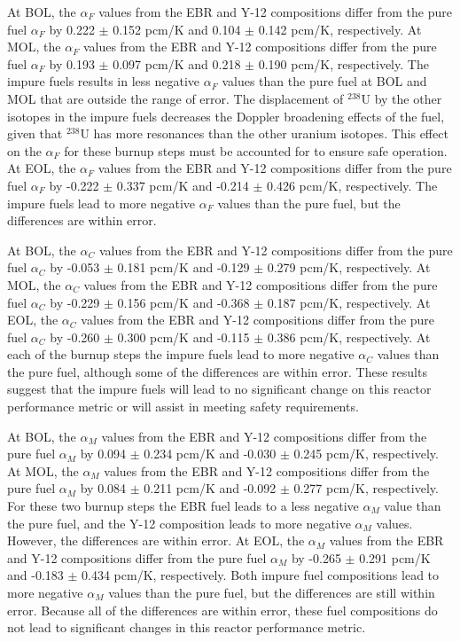 At \gls*{BOL}, the $\alpha_F$ values from the \gls*{EBR} and Y-12 compositions 
differ from the pure fuel $\alpha_F$ by 0.222 $\pm$ 0.152 pcm/K and 
0.104 $\pm$ 0.142 pcm/K, respectively. At \gls*{MOL}, the $\alpha_F$ 
values from the \gls*{EBR} and Y-12 compositions 
differ from the pure fuel $\alpha_F$ by 0.193 $\pm$ 0.097 pcm/K and 
0.218 $\pm$ 0.190 pcm/K, respectively. The impure fuels 
results in less negative $\alpha_F$ values than the pure fuel
at \gls*{BOL} and \gls*{MOL} that are outside the range of 
error. The displacement of $^{238}$U by the other isotopes 
in the impure fuels decreases the Doppler broadening effects 
of the fuel, given that $^{238}$U has more resonances than 
the other uranium isotopes. This effect on the $\alpha_F$ 
for these burnup steps must be accounted for to ensure 
safe operation. 
At \gls*{EOL}, the $\alpha_F$ 
values from the \gls*{EBR} and Y-12 compositions 
differ from the pure fuel $\alpha_F$ by -0.222 $\pm$ 0.337 
pcm/K and -0.214 $\pm$ 0.426 pcm/K, respectively. The 
impure fuels lead to more negative $\alpha_F$ values than 
the pure fuel, but the differences are within error. 

At \gls*{BOL}, the $\alpha_C$ values from the \gls*{EBR} and Y-12 compositions 
differ from the pure fuel $\alpha_C$ by -0.053 $\pm$ 0.181 pcm/K and 
-0.129 $\pm$ 0.279 pcm/K, respectively. At \gls*{MOL}, the $\alpha_C$ 
values from the \gls*{EBR} and Y-12 compositions 
differ from the pure fuel $\alpha_C$ by -0.229 $\pm$ 0.156 pcm/K and 
-0.368 $\pm$ 0.187 pcm/K, respectively. At \gls*{EOL}, the $\alpha_C$ 
values from the \gls*{EBR} and Y-12 compositions 
differ from the pure fuel $\alpha_C$ by -0.260 $\pm$ 0.300 pcm/K and 
-0.115 $\pm$ 0.386 pcm/K, respectively. At each of the burnup 
steps the impure fuels lead to more negative $\alpha_C$ values 
than the pure fuel, although some of the differences are 
within error. These results suggest that the impure fuels 
will lead to no significant change on this reactor 
performance metric or will assist in meeting safety 
requirements. 

At \gls*{BOL}, the $\alpha_M$ values from the \gls*{EBR} and Y-12 compositions 
differ from the pure fuel $\alpha_M$ by 0.094 $\pm$ 0.234 pcm/K and 
-0.030 $\pm$ 0.245 pcm/K, respectively. At \gls*{MOL}, the $\alpha_M$ 
values from the \gls*{EBR} and Y-12 compositions 
differ from the pure fuel $\alpha_M$ by 0.084 $\pm$ 0.211 pcm/K and 
-0.092 $\pm$ 0.277 pcm/K, respectively. For these two burnup 
steps the \gls*{EBR} fuel leads to a less negative $\alpha_M$ value than the pure fuel, and the Y-12 composition leads 
to more negative $\alpha_M$ values. However, the differences are within 
error. At \gls*{EOL}, the $\alpha_M$ 
values from the \gls*{EBR} and Y-12 compositions 
differ from the pure fuel $\alpha_M$ by -0.265 $\pm$ 0.291 pcm/K and 
-0.183 $\pm$ 0.434 pcm/K, respectively. Both impure fuel 
compositions lead to more negative $\alpha_M$ values than the 
pure fuel, but the differences are still within error. 
Because all of the differences are within error, these fuel 
compositions do not lead to significant changes in this 
reactor performance metric. 


